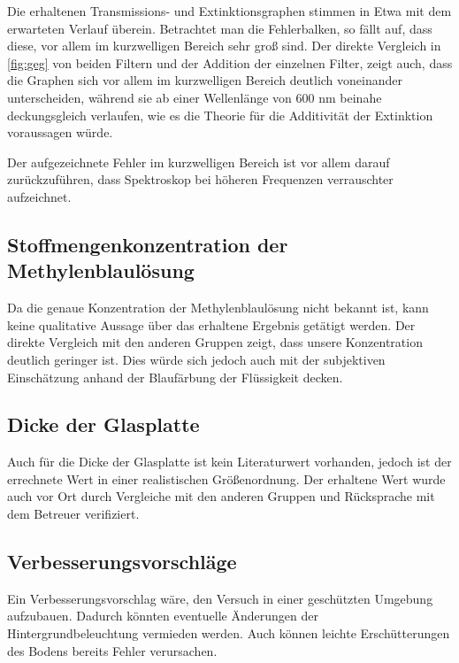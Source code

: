 \documentclass[11pt,ngerman]{scrartcl}
\begin{document}
\noindent Die erhaltenen Transmissions- und Extinktionsgraphen stimmen in Etwa mit dem erwarteten Verlauf überein. Betrachtet man die Fehlerbalken, so fällt auf, dass diese, vor allem im kurzwelligen Bereich sehr groß sind. Der direkte Vergleich in \autoref{fig:geg} von beiden Filtern und der Addition der einzelnen Filter, zeigt auch, dass die Graphen sich vor allem im kurzwelligen Bereich deutlich voneinander unterscheiden, während sie ab einer Wellenlänge von 600 nm beinahe deckungsgleich verlaufen, wie es die Theorie für die Additivität der Extinktion voraussagen würde.

\vspace{2mm}

\noindent Der aufgezeichnete Fehler im kurzwelligen Bereich ist vor allem darauf zurückzuführen, dass Spektroskop bei höheren Frequenzen verrauschter aufzeichnet.

\subsection{Stoffmengenkonzentration der Methylenblaulösung}

\noindent Da die genaue Konzentration der Methylenblaulösung nicht bekannt ist, kann keine qualitative Aussage über das erhaltene Ergebnis getätigt werden. Der direkte Vergleich mit den anderen Gruppen zeigt, dass unsere Konzentration deutlich geringer ist. Dies würde sich jedoch auch mit der subjektiven Einschätzung anhand der Blaufärbung der Flüssigkeit decken.

\subsection{Dicke der Glasplatte}

\noindent Auch für die Dicke der Glasplatte ist kein Literaturwert vorhanden, jedoch ist der errechnete Wert in einer realistischen Größenordnung. Der erhaltene Wert wurde auch vor Ort durch Vergleiche mit den anderen Gruppen und Rücksprache mit dem Betreuer verifiziert.

\subsection{Verbesserungsvorschläge}

\noindent Ein Verbesserungsvorschlag wäre, den Versuch in einer geschützten
Umgebung aufzubauen. Dadurch könnten eventuelle Änderungen der
Hintergrundbeleuchtung vermieden werden. Auch können leichte Erschütterungen
des Bodens bereits Fehler verursachen.
\end{document}
